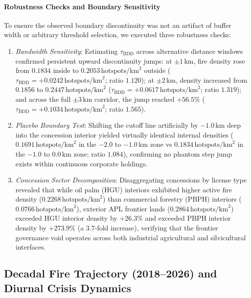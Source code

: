 \paragraph{Robustness Checks and Boundary Sensitivity}
To ensure the observed boundary discontinuity was not an artifact of buffer width or arbitrary threshold selection, we executed three robustness checks:
\begin{enumerate}
    \item \textit{Bandwidth Sensitivity}: Estimating $\tau_{\text{BDD}}$ across alternative distance windows confirmed persistent upward discontinuity jumps: at $\pm 1\,\text{km}$, fire density rose from $0.1834$ inside to $0.2053\,\text{hotspots}/\text{km}^2$ outside ($\tau_{\text{BDD}} = +0.0242\,\text{hotspots}/\text{km}^2$; ratio $1.120$); at $\pm 2\,\text{km}$, density increased from $0.1856$ to $0.2447\,\text{hotspots}/\text{km}^2$ ($\tau_{\text{BDD}} = +0.0617\,\text{hotspots}/\text{km}^2$; ratio $1.319$); and across the full $\pm 3\,\text{km}$ corridor, the jump reached $+56.5\%$ ($\tau_{\text{BDD}} = +0.1034\,\text{hotspots}/\text{km}^2$; ratio $1.565$).
    \item \textit{Placebo Boundary Test}: Shifting the cutoff line artificially by $-1.0\,\text{km}$ deep into the concession interior yielded virtually identical internal densities ($0.1691\,\text{hotspots}/\text{km}^2$ in the $-2.0$ to $-1.0\,\text{km}$ zone vs $0.1834\,\text{hotspots}/\text{km}^2$ in the $-1.0$ to $0.0\,\text{km}$ zone; ratio $1.084$), confirming no phantom step jump exists within continuous corporate holdings.
    \item \textit{Concession Sector Decomposition}: Disaggregating concessions by license type revealed that while oil palm (HGU) interiors exhibited higher active fire density ($0.2268\,\text{hotspots}/\text{km}^2$) than commercial forestry (PBPH) interiors ($0.0766\,\text{hotspots}/\text{km}^2$), exterior APL frontier lands ($0.2864\,\text{hotspots}/\text{km}^2$) exceeded HGU interior density by $+26.3\%$ and exceeded PBPH interior density by $+273.9\%$ (a $3.7$-fold increase), verifying that the frontier governance void operates across both industrial agricultural and silvicultural interfaces.
\end{enumerate}

\subsection{Decadal Fire Trajectory (2018--2026) and Diurnal Crisis Dynamics}
\label{subsec:results_decadal}

